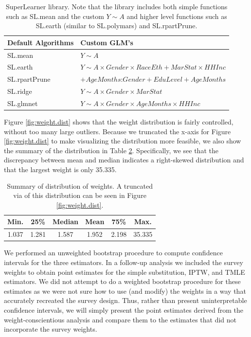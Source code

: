\documentclass{article}
\begin{document}
\begin{table}[tbp]
\centering
\begin{tabular}{l | l}
Default Algorithms & Custom GLM's \\
\hline
SL.mean & $Y \sim A$ \\
SL.earth & $Y \sim A \times Gender \times RaceEth + MarStat \times HHInc$ \\
SL.rpartPrune & $+ AgeMonths$:$Gender + EduLevel + AgeMonths $ \\
SL.ridge & $Y \sim A \times Gender \times MarStat$ \\
SL.glmnet &  $Y \sim A \times Gender \times AgeMonths \times HHInc$ \\
\end{tabular}
\caption{SuperLearner library. Note that the library includes both simple functions such as SL.mean and the custom $Y\sim A$ and higher level functions such as SL.earth (similar to SL.polymars) and SL.rpartPrune.}
\label{tab:sl.lib}
\end{table}

Figure \ref{fig:weight.dist}  shows that the weight distribution is fairly controlled, without too many large outliers. Because we truncated the x-axis for Figure \ref{fig:weight.dist} to make visualizing the distribution more feasible, we also show the summary of the distribution in Table \ref{tab:weight.summary}. Specifically, we see that the discrepancy between mean and median indicates a right-skewed distribution and that the largest weight is only 35.335.

\begin{table}[tbp]
\centering
\begin{tabular}{cccccc}
  \hline
 Min. & 25\% & Median & Mean & 75\% & Max. \\ 
  \hline
 1.037   & 1.281   & 1.587   & 1.952   &  2.198   &  35.335   \\ 
   \hline
\end{tabular}
\caption{Summary of distribution of weights. A truncated via of this distribution can be seen in Figure \ref{fig:weight.dist}.}
\label{tab:weight.summary}
\end{table}

We performed an unweighted bootstrap procedure to compute confidence intervals for the three estimators. In a follow-up analysis we included the survey weights to obtain point estimates for the simple substitution, IPTW, and TMLE estimators. We did not attempt to do a weighted bootstrap procedure for these estimates as we were not sure how to use (and modify) the weights in a way that accurately recreated the survey design. Thus, rather than present uninterpretable confidence intervals, we will simply present the point estimates derived from the weight-conscientious analysis and compare them to the estimates that did not incorporate the survey weights.
\end{document}
